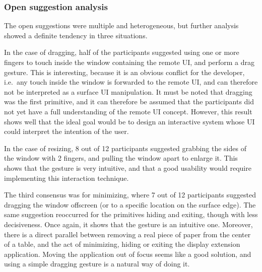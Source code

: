 \subsubsection{Open suggestion analysis}

The open suggestions were multiple and heterogeneous, but further analysis showed a definite tendency in three situations.

In the case of dragging, half of the participants suggested using one or more fingers to touch inside the window containing the remote UI, and perform a drag gesture.
This is interesting, because it is an obvious conflict for the developer, i.e.\ any touch inside the window is forwarded to the remote UI, and can therefore not be interpreted as a surface UI manipulation.
It must be noted that dragging was the first primitive, and it can therefore be assumed that the participants did not yet have a full understanding of the remote UI concept.
However, this result shows well that the ideal goal would be to design an interactive system whose UI could interpret the intention of the user.

In the case of resizing, 8 out of 12 participants suggested grabbing the sides of the window with 2 fingers, and pulling the window apart to enlarge it.
This shows that the gesture is very intuitive, and that a good usability would require implementing this interaction technique.

The third consensus was for minimizing, where 7 out of 12 participants suggested dragging the window offscreen (or to a specific location on the surface edge).
The same suggestion reoccurred for the primitives hiding and exiting, though with less decisiveness.
Once again, it shows that the gesture is an intuitive one.
Moreover, there is a direct parallel between removing a real piece of paper from the center of a table, and the act of minimizing, hiding or exiting the display extension application.
Moving the application out of focus seems like a good solution, and using a simple dragging gesture is a natural way of doing it.

%
%
%
%
%

